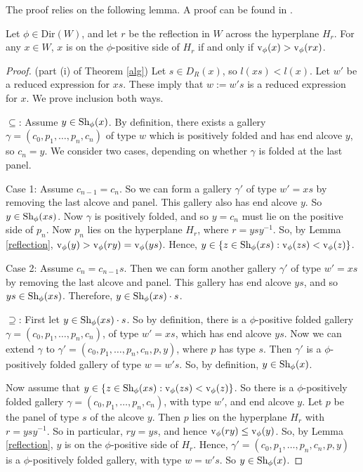 \documentclass[11pt]{article}
\begin{document}
The proof relies on the following lemma. A proof can be found in \cite[p.134]{SHA}.
\begin{lemma}\label{reflection}
    Let $\phi\in$Dir$(W)$, and let $r$ be the reflection in $W$ across the hyperplane $H_r$. For any $x\in W$, $x$ is on the $\phi$-positive side of $H_r$ if and only if $\textnormal{v}_\phi(x)>\textnormal{v}_\phi(rx)$. 
\end{lemma}

\begin{proof}
    (part (i) of Theorem \ref{alg}) Let $s\in D_R(x)$, so $l(xs)<l(x)$. Let $w'$ be a reduced expression for $xs$. These imply that $w:=w's$ is a reduced expression for $x$. We prove inclusion both ways.

    $\subseteq$: Assume $y\in\textnormal{Sh}_\phi(x)$. By definition, there exists a gallery $\gamma=(c_0,p_1,\hdots, p_n,c_n)$ of type $w$ which is positively folded and has end alcove $y$, so $c_n=y$. We consider two cases, depending on whether $\gamma$ is folded at the last panel. 

    Case 1: Assume $c_{n-1}=c_n$. So we can form a gallery $\gamma'$ of type $w'=xs$ by removing the last alcove and panel. This gallery also has end alcove $y$. So $y\in\textnormal{Sh}_\phi(xs)$. Now $\gamma$ is positively folded, and so $y=c_n$ must lie on the positive side of $p_n$. Now $p_n$ lies on the hyperplane $H_r$, where $r=ysy^{-1}$. So, by Lemma \ref{reflection}, $\textnormal{v}_\phi(y)>\textnormal{v}_\phi(ry)=\textnormal{v}_\phi(ys)$. Hence, $y\in \{z\in \textnormal{Sh}_\phi(xs):\textnormal{v}_\phi(zs)<\textnormal{v}_\phi(z)\}$.

    Case 2: Assume $c_{n}=c_{n-1}s$. Then we can form another gallery $\gamma'$ of type $w'=xs$ by removing the last alcove and panel. This gallery has end alcove $ys$, and so $ys\in \textnormal{Sh}_\phi(xs)$. Therefore, $y\in \textnormal{Sh}_\phi(xs)\cdot s$. 

    $\supseteq$: First let $y\in \textnormal{Sh}_\phi(xs)\cdot s$. So by definition, there is a $\phi$-positive folded gallery $\gamma=(c_0,p_1,\hdots, p_n,c_n)$, of type $w'=xs$, which has end alcove $ys$. Now we can extend $\gamma$ to $\gamma'=(c_0,p_1,\hdots, p_n,c_n,p,y)$, where $p$ has type $s$. Then $\gamma'$ is a $\phi$-positively folded gallery of type $w=w's$. So, by definition, $y\in \textnormal{Sh}_\phi(x)$.

    Now assume that $y\in \{z\in \textnormal{Sh}_\phi(xs):\textnormal{v}_\phi(zs)<\textnormal{v}_\phi(z)\}$. So there is a $\phi$-positively folded gallery $\gamma = (c_0,p_1,\hdots, p_n,c_n)$, with type $w'$, and end alcove $y$. Let $p$ be the panel of type $s$ of the alcove $y$. Then $p$ lies on the hyperplane $H_r$ with $r=ysy^{-1}$. So in particular, $ry=ys$, and hence $\textnormal{v}_\phi(ry)\leq \textnormal{v}_\phi(y)$. So, by Lemma \ref{reflection}, $y$ is on the $\phi$-positive side of $H_r$. Hence, $\gamma'=(c_0,p_1,\hdots, p_n,c_n,p,y)$ is a $\phi$-positively folded gallery, with type $w=w's$. So $y\in \textnormal{Sh}_\phi(x)$. 
\end{proof}
\end{document}
